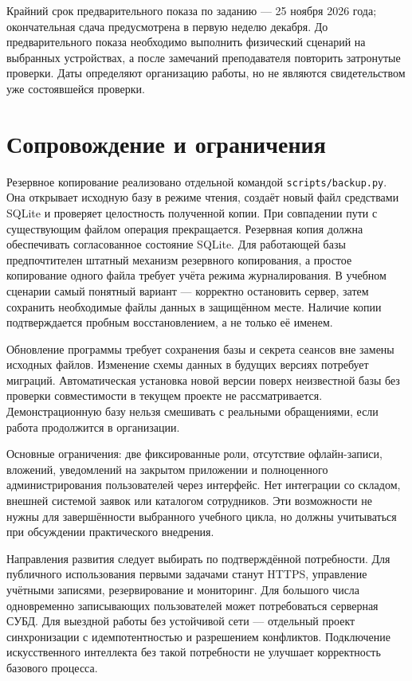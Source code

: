 \documentclass{timcw}
\begin{document}
Крайний срок предварительного показа по заданию — 25 ноября 2026 года; окончательная сдача предусмотрена в первую неделю декабря. До предварительного показа необходимо выполнить физический сценарий на выбранных устройствах, а после замечаний преподавателя повторить затронутые проверки. Даты определяют организацию работы, но не являются свидетельством уже состоявшейся проверки.

\section{Сопровождение и ограничения}

Резервное копирование реализовано отдельной командой \nolinkurl{scripts/backup.py}. Она открывает исходную базу в режиме чтения, создаёт новый файл средствами SQLite и проверяет целостность полученной копии. При совпадении пути с существующим файлом операция прекращается. Резервная копия должна обеспечивать согласованное состояние SQLite. Для работающей базы предпочтителен штатный механизм резервного копирования, а простое копирование одного файла требует учёта режима журналирования. В учебном сценарии самый понятный вариант — корректно остановить сервер, затем сохранить необходимые файлы данных в защищённом месте. Наличие копии подтверждается пробным восстановлением, а не только её именем.

Обновление программы требует сохранения базы и секрета сеансов вне замены исходных файлов. Изменение схемы данных в будущих версиях потребует миграций. Автоматическая установка новой версии поверх неизвестной базы без проверки совместимости в текущем проекте не рассматривается. Демонстрационную базу нельзя смешивать с реальными обращениями, если работа продолжится в организации.

Основные ограничения: две фиксированные роли, отсутствие офлайн-записи, вложений, уведомлений на закрытом приложении и полноценного администрирования пользователей через интерфейс. Нет интеграции со складом, внешней системой заявок или каталогом сотрудников. Эти возможности не нужны для завершённости выбранного учебного цикла, но должны учитываться при обсуждении практического внедрения.

Направления развития следует выбирать по подтверждённой потребности. Для публичного использования первыми задачами станут HTTPS, управление учётными записями, резервирование и мониторинг. Для большого числа одновременно записывающих пользователей может потребоваться серверная СУБД. Для выездной работы без устойчивой сети — отдельный проект синхронизации с идемпотентностью и разрешением конфликтов. Подключение искусственного интеллекта без такой потребности не улучшает корректность базового процесса.
\end{document}
